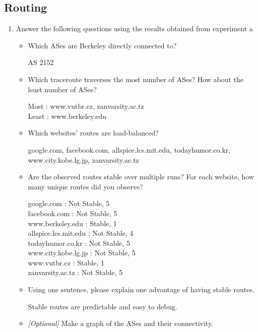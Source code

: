 \documentclass[10pt]{article}
\begin{document}
\newpage
\subsection*{Routing}

\begin{enumerate}

\item Answer the following questions using the results obtained from experiment a

\begin{itemize}

\item Which ASes are Berkeley directly connected to?

AS 2152

\item Which traceroute traverses the most number of ASes? How about the least number of ASes?

Most : www.vutbr.cz, zanvarsity.ac.tz \\
Least : www.berkeley.edu

\item Which websites' routes are load-balanced?

google.com, facebook.com, allspice.lcs.mit.edu, todayhumor.co.kr, www.city.kobe.lg.jp, zanvarsity.ac.tz

\item Are the observed routes stable over multiple runs? For each website, how many unique routes did you observe?

google.com : Not Stable, 5 \\
facebook.com : Not Stable, 5 \\
www.berkeley.edu : Stable, 1 \\
allspice.lcs.mit.edu : Not Stable, 4 \\
todayhumor.co.kr : Not Stable, 5 \\
www.city.kobe.lg.jp : Not Stable, 5 \\
www.vutbr.cz : Stable, 1 \\
zanvarsity.ac.tz : Not Stable, 5

\item Using one sentence, please explain one advantage of having stable routes.

Stable routes are predictable and easy to debug.

\item \emph{[Optional]} Make a graph of the ASes and their connectivity.


\end{itemize}
\end{enumerate}
\end{document}
